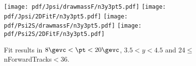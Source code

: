 \begin{figure}[H]
\begin{center}
\texttt{[image: pdf/Jpsi/drawmassF/n3y3pt5.pdf]}
\texttt{[image: pdf/Jpsi/2DFitF/n3y3pt5.pdf]}
\vspace*{-0.5cm}
\texttt{[image: pdf/Psi2S/drawmassF/n3y3pt5.pdf]}
\texttt{[image: pdf/Psi2S/2DFitF/n3y3pt5.pdf]}
\vspace*{-0.5cm}
\end{center}
\caption{Fit results in $8\gevc<\pt<20\gevc$, $3.5<y<4.5$ and 24$\leq$nForwardTracks$<$36.}
\label{Fitn3y3pt5}
\end{figure}
